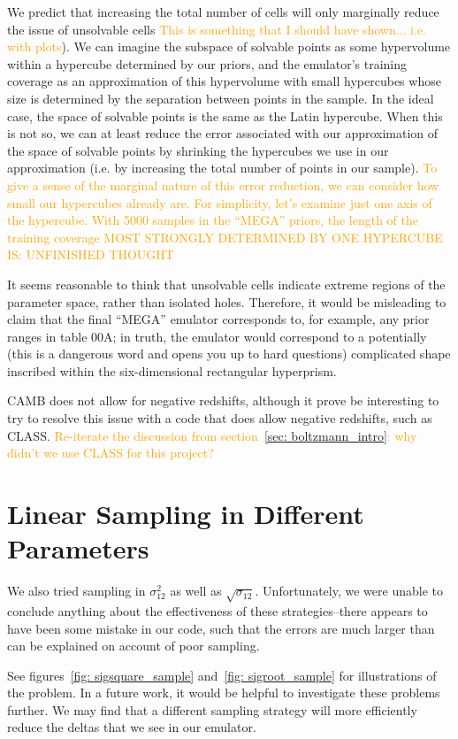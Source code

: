 We predict that increasing the total number of cells will only marginally
reduce the issue of unsolvable cells \textcolor{orange}{This is something that 
I should have shown... i.e. with plots}). We can imagine the subspace of
solvable points as some hypervolume within a hypercube determined by our
priors, and the emulator's training coverage as an approximation of this 
hypervolume with small hypercubes whose size is determined by the separation 
between points in the sample. In the ideal case, the space of solvable points 
is the same as the Latin hypercube. When this is not so, we can at least
reduce the error associated with our approximation of the space of solvable
points by shrinking the hypercubes we use in our approximation (i.e. by
increasing the total number of points in our sample). \textcolor{orange}{
To give a sense of the marginal nature of this error reduction, we can
consider how small our hypercubes already are. For simplicity, let's examine
just one axis of the hypercube. With 5000 samples in the ``MEGA'' priors,
the length of the training coverage MOST STRONGLY DETERMINED BY ONE HYPERCUBE
IS: UNFINISHED THOUGHT}

It seems reasonable to think that unsolvable cells indicate extreme regions of 
the parameter space, rather than isolated holes. Therefore, it would be 
misleading to claim that the final ``MEGA'' emulator corresponds to, for 
example, any prior ranges in table 00A; in truth, the emulator would 
correspond to a potentially (this is a dangerous word and opens you up to hard 
questions) complicated shape inscribed within the six-dimensional rectangular 
hyperprism.

CAMB does not allow for negative redshifts, although it prove be 
interesting to try to resolve this issue with a code that does allow negative 
redshifts, such as CLASS. \textcolor{orange}{Re-iterate the discussion from
section~\ref{sec: boltzmann_intro}: why didn’t we use CLASS for this project?}

\section{Linear Sampling in Different Parameters}

We also tried sampling in $\sigma_{12}^2$ as well as $\sqrt{\sigma_{12}}$.
Unfortunately, we were unable to conclude anything about the effectiveness of
these strategies--there appears to have been some mistake in our code, such
that the errors are much larger than can be explained on account of poor
sampling.

See figures~\ref{fig: sigsquare_sample} and~\ref{fig: sigroot_sample} for
illustrations of the problem. In a future work, it would be helpful to
investigate these problems further. We may find that a different sampling
strategy will more efficiently reduce the deltas that we see in our emulator.

